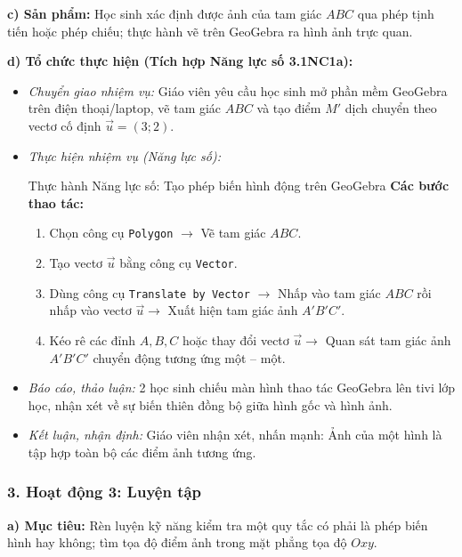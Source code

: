 \documentclass[12pt, a4paper]{article}
\renewcommand{\vec}[1]{\overrightarrow{#1}}
\begin{document}
\textbf{c) Sản phẩm:} Học sinh xác định được ảnh của tam giác $ABC$ qua phép tịnh tiến hoặc phép chiếu; thực hành vẽ trên GeoGebra ra hình ảnh trực quan.

\textbf{d) Tổ chức thực hiện (Tích hợp Năng lực số 3.1NC1a):}
\begin{itemize}[leftmargin=0.6cm]
    \item \textit{Chuyển giao nhiệm vụ:} Giáo viên yêu cầu học sinh mở phần mềm GeoGebra trên điện thoại/laptop, vẽ tam giác $ABC$ và tạo điểm $M'$ dịch chuyển theo vectơ cố định $\vec{u} = (3; 2)$.
    \item \textit{Thực hiện nhiệm vụ (Năng lực số):}
    \begin{aibox}{Thực hành Năng lực số: Tạo phép biến hình động trên GeoGebra}
        \textbf{Các bước thao tác:}
        \begin{enumerate}[leftmargin=0.5cm]
            \item Chọn công cụ \texttt{Polygon} $\to$ Vẽ tam giác $ABC$.
            \item Tạo vectơ $\vec{u}$ bằng công cụ \texttt{Vector}.
            \item Dùng công cụ \texttt{Translate by Vector} $\to$ Nhấp vào tam giác $ABC$ rồi nhấp vào vectơ $\vec{u} \to$ Xuất hiện tam giác ảnh $A'B'C'$.
            \item Kéo rê các đỉnh $A, B, C$ hoặc thay đổi vectơ $\vec{u} \to$ Quan sát tam giác ảnh $A'B'C'$ chuyển động tương ứng một -- một.
        \end{enumerate}
    \end{aibox}
    \item \textit{Báo cáo, thảo luận:} 2 học sinh chiếu màn hình thao tác GeoGebra lên tivi lớp học, nhận xét về sự biến thiên đồng bộ giữa hình gốc và hình ảnh.
    \item \textit{Kết luận, nhận định:} Giáo viên nhận xét, nhấn mạnh: Ảnh của một hình là tập hợp toàn bộ các điểm ảnh tương ứng.
\end{itemize}

\subsubsection*{3. Hoạt động 3: Luyện tập}
\textbf{a) Mục tiêu:} Rèn luyện kỹ năng kiểm tra một quy tắc có phải là phép biến hình hay không; tìm tọa độ điểm ảnh trong mặt phẳng tọa độ $Oxy$.
\end{document}
